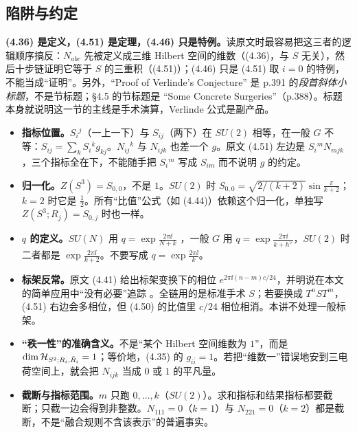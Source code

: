 \subsection{陷阱与约定}

\begin{keypoint}
\textbf{(4.36) 是定义，(4.51) 是定理，(4.46) 只是特例。}读原文时最容易把这三者的逻辑顺序搞反：$N_{abc}$ 先被定义成三维 Hilbert 空间的维数（(4.36)，与 $S$ 无关），然后十步链证明它等于 $S$ 的三重积（(4.51)）；(4.46) 只是 (4.51) 取 $i=0$ 的特例，不能当成“证明”。另外，“Proof of Verlinde's Conjecture” 是 p.391 的\emph{段首斜体小标题}，不是节标题；\S4.5 的节标题是 “Some Concrete Surgeries”（p.388）。标题本身就说明这一节的主线是手术演算，Verlinde 公式是副产品。
\end{keypoint}

\begin{itemize}[leftmargin=1.6em]
  \item \textbf{指标位置。}$S_i{}^j$（一上一下）与 $S_{ij}$（两下）在 $SU(2)$ 相等，在一般 $G$ 不等：$S_{ij}=\sum_k S_i{}^k g_{kj}$。$N_{ij}{}^k$ 与 $N_{ijk}$ 也差一个 $g$。原文 (4.51) 左边是 $S_i{}^mN_{mjk}$，三个指标全在下，不能随手把 $S_i{}^m$ 写成 $S_{im}$ 而不说明 $g$ 的约定。
  \item \textbf{归一化。}$Z(S^3)=S_{0,0}$，不是 $1$。$SU(2)$ 时 $S_{0,0}=\sqrt{2/(k+2)}\sin\frac{\pi}{k+2}$；$k=2$ 时它是 $\frac12$。所有“比值”公式（如 (4.44)）依赖这个归一化，单独写 $Z(S^3;R_j)=S_{0,j}$ 时也一样。
  \item \textbf{$q$ 的定义。}$SU(N)$ 用 $q=\exp\frac{2\pi\ii}{N+k}$ ，一般 $G$ 用 $q=\exp\frac{2\pi\ii}{k+h^\vee}$，$SU(2)$ 时二者都是 $\exp\frac{2\pi\ii}{k+2}$。不要写成 $q=\exp\frac{2\pi\ii}{k}$。
  \item \textbf{标架反常。}原文 (4.41) 给出标架变换下的相位 $e^{2\pi\ii(n-m)c/24}$，并明说在本文的简单应用中“没有必要”追踪 。全链用的是标准手术 $S$；若要换成 $T^nST^m$，(4.51) 右边会多相位，但 (4.50) 的比值里 $c/24$ 相位相消。本讲不处理一般标架。
  \item \textbf{“秩一性”的准确含义。}不是“某个 Hilbert 空间维数为 $1$”，而是 $\dim\mathcal{H}_{S^2;R_i,\bar R_i}=1$；等价地，(4.35) 的 $g_{i\bar i}=1$。若把“维数一”错误地安到三电荷空间上，就会把 $N_{ijk}$ 当成 $0$ 或 $1$ 的平凡量。
  \item \textbf{截断与指标范围。}$m$ 只跑 $0,\dots,k$（$SU(2)$）。求和指标和结果指标都要截断；只截一边会得到非整数。$N_{111}=0$（$k=1$）与 $N_{221}=0$（$k=2$）都是截断，不是“融合规则不含该表示”的普遍事实。
\end{itemize}

